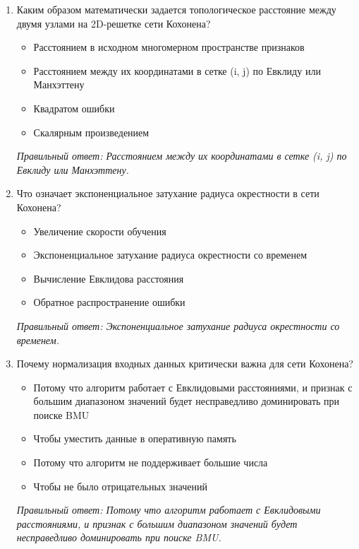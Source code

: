 \begin{enumerate}[label=\textbf{\arabic*.}, leftmargin=0pt, itemsep=1.2em]
\item Каким образом математически задается топологическое расстояние между двумя узлами на 2D-решетке сети Кохонена?
\begin{itemize}[label=$\square$, leftmargin=1.5cm, itemsep=0.2em, topsep=0.3em]
\item Расстоянием в исходном многомерном пространстве признаков
\item Расстоянием между их координатами в сетке (i, j) по Евклиду или Манхэттену
\item Квадратом ошибки
\item Скалярным произведением
\end{itemize}
{\small\textit{Правильный ответ: Расстоянием между их координатами в сетке (i, j) по Евклиду или Манхэттену.}}

\item Что означает экспоненциальное затухание радиуса окрестности в сети Кохонена?
\begin{itemize}[label=$\square$, leftmargin=1.5cm, itemsep=0.2em, topsep=0.3em]
\item Увеличение скорости обучения
\item Экспоненциальное затухание радиуса окрестности со временем
\item Вычисление Евклидова расстояния
\item Обратное распространение ошибки
\end{itemize}
{\small\textit{Правильный ответ: Экспоненциальное затухание радиуса окрестности со временем.}}

\item Почему нормализация входных данных критически важна для сети Кохонена?
\begin{itemize}[label=$\square$, leftmargin=1.5cm, itemsep=0.2em, topsep=0.3em]
\item Потому что алгоритм работает с Евклидовыми расстояниями, и признак с большим диапазоном значений будет несправедливо доминировать при поиске BMU
\item Чтобы уместить данные в оперативную память
\item Потому что алгоритм не поддерживает большие числа
\item Чтобы не было отрицательных значений
\end{itemize}
{\small\textit{Правильный ответ: Потому что алгоритм работает с Евклидовыми расстояниями, и признак с большим диапазоном значений будет несправедливо доминировать при поиске BMU.}}


\end{enumerate}

